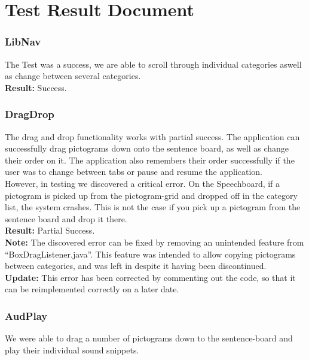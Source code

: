 \section{Test Result Document}

\subsubsection*{LibNav}
The Test was a success, we are able to scroll through individual categories aswell as change between several categories.\\

\textbf{Result:} Success.

\subsubsection*{DragDrop}
The drag and drop functionality works with partial success.
The application can successfully drag pictograms down onto the sentence board, as well as change their order on it.
The application also remembers their order successfully if the user was to change between tabs or pause and resume the application.\\

However, in testing we discovered a critical error. On the Speechboard, if a pictogram is picked up from the pictogram-grid and dropped off in the category list, the system crashes.
This is not the case if you pick up a pictogram from the sentence board and drop it there.\\

\textbf{Result: }Partial Success.\\

\textbf{Note:} The discovered error can be fixed by removing an unintended feature from ``BoxDragListener.java''. This feature was intended to allow copying pictograms between categories, and was left in despite it having been discontinued. \\

\textbf{Update:} This error has been corrected by commenting out the code, so that it can be reimplemented correctly on a later date.

\subsubsection*{AudPlay}
We were able to drag a number of pictograms down to the sentence-board and play their individual sound snippets.\\

